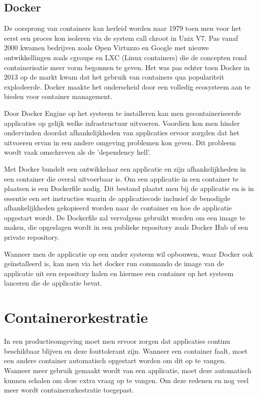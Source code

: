 \subsection{Docker}

De oorsprong van containers kan herleid worden naar 1979 toen men voor het eerst een proces kon isoleren via de system call chroot in Unix V7. Pas vanaf 2000 kwamen bedrijven zoals Open Virtuzzo en Google met nieuwe ontwikkellingen zoals cgroups en LXC (Linux containers) die de concepten rond containerisatie meer vorm begonnen te geven. Het was pas echter toen Docker in 2013 op de markt kwam dat het gebruik van containers qua populariteit explodeerde. 
Docker maakte het onderscheid door een volledig ecosysteem aan te bieden voor container management.\autocite{Osnat2020} 

Door Docker Engine op het systeem te installeren kan men gecontaineriseerde applicaties op gelijk welke infrastructuur uitvoeren. Voordien kon men hinder ondervinden doordat afhankelijkheden van applicaties ervoor zorgden dat het uitvoeren ervan in een andere omgeving problemen kon geven. Dit probleem wordt vaak omschreven als de 'dependency hell'.

Met Docker bundelt een ontwikkelaar een applicatie en zijn afhankelijkheden in een container die overal uitvoerbaar is. Om een applicatie in een container te plaatsen is een Dockerfile nodig. 
Dit bestand plaatst men bij de applicatie en is in essentie een set instructies waarin de applicatiecode inclusief de benodigde afhankelijkheden gekopieerd worden naar de container en hoe de applicatie opgestart wordt. De Dockerfile zal vervolgens gebruikt worden om een image te maken, die opgeslagen wordt in een publieke repository zoals Docker Hub of een private repository.

Wanneer men de applicatie op een ander systeem wil opbouwen, waar Docker ook geïnstalleerd is, kan men via het docker run commando de image van de applicatie uit een repository halen en hiermee een container op het systeem lanceren die de applicatie bevat.  

\section{Containerorkestratie}

In een productieomgeving moet men ervoor zorgen dat applicaties continu beschikbaar blijven en deze fouttolerant zijn. Wanneer een container faalt, moet een andere container automatisch opgestart worden om dit op te vangen. Wanneer meer gebruik gemaakt wordt van een applicatie, moet deze automatisch kunnen schalen om deze extra vraag op te vangen. Om deze redenen en nog veel meer wordt containerorkestratie toegepast.

